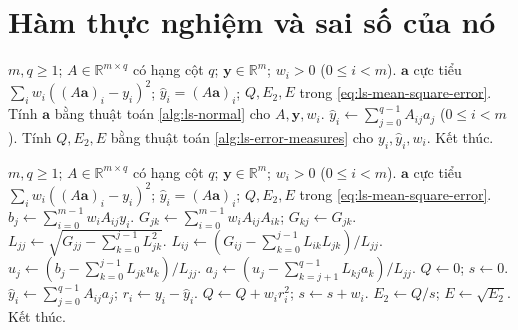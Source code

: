 \documentclass[12pt,a4paper,oneside]{book}
\numberwithin{algorithm}{chapter}
\theoremstyle{definition}
\newcommand{\R}{\mathbb{R}}
\begin{document}
\section{Hàm thực nghiệm và sai số của nó}
\begin{algorithm}[H]
\caption{Bình phương tối thiểu và sai số: sơ lược}
\label{alg:ls-fit-errors-short}
\begin{algorithmic}[1]
\Require $m,q\geq1$; $A\in\R^{m\times q}$ có hạng cột $q$; $\boldsymbol y\in\R^m$; $w_i>0$ ($0\leq i<m$).
\Ensure $\boldsymbol a$ cực tiểu $\sum_iw_i((A\boldsymbol a)_i-y_i)^2$; $\widehat y_i=(A\boldsymbol a)_i$; $Q,E_2,E$ trong \eqref{eq:ls-mean-square-error}.
\State Tính $\boldsymbol a$ bằng thuật toán \ref{alg:ls-normal} cho $A,\boldsymbol y,w_i$.
\State $\widehat y_i\gets\sum_{j=0}^{q-1}A_{ij}a_j$ ($0\leq i<m$).
\State Tính $Q,E_2,E$ bằng thuật toán \ref{alg:ls-error-measures} cho $y_i,\widehat y_i,w_i$.
\State Kết thúc.
\end{algorithmic}
\end{algorithm}
\begin{algorithm}[H]
\caption{Bình phương tối thiểu và sai số: chi tiết}
\label{alg:ls-fit-errors}
\begin{algorithmic}[1]
\Require $m,q\geq1$; $A\in\R^{m\times q}$ có hạng cột $q$; $\boldsymbol y\in\R^m$; $w_i>0$ ($0\leq i<m$).
\Ensure $\boldsymbol a$ cực tiểu $\sum_iw_i((A\boldsymbol a)_i-y_i)^2$; $\widehat y_i=(A\boldsymbol a)_i$; $Q,E_2,E$ trong \eqref{eq:ls-mean-square-error}.
 \State $b_j\gets\sum_{i=0}^{m-1}w_iA_{ij}y_i$.
  \State $G_{jk}\gets\sum_{i=0}^{m-1}w_iA_{ij}A_{ik}$; $G_{kj}\gets G_{jk}$.
 \EndFor
\EndFor
\Statex
{}
 \State $L_{jj}\gets\sqrt{G_{jj}-\sum_{k=0}^{j-1}L_{jk}^2}$.
  \State $L_{ij}\gets(G_{ij}-\sum_{k=0}^{j-1}L_{ik}L_{jk})/L_{jj}$.
 \EndFor
\EndFor
\Statex
{}
 \State $u_j\gets(b_j-\sum_{k=0}^{j-1}L_{jk}u_k)/L_{jj}$.
\EndFor
\Statex
{}
 \State $a_j\gets(u_j-\sum_{k=j+1}^{q-1}L_{kj}a_k)/L_{jj}$.
\EndFor
\Statex
\State $Q\gets0$; $s\gets0$.
 \State $\widehat y_i\gets\sum_{j=0}^{q-1}A_{ij}a_j$; $r_i\gets y_i-\widehat y_i$.
 \State $Q\gets Q+w_ir_i^2$; $s\gets s+w_i$.
\EndFor
\Statex
\State $E_2\gets Q/s$; $E\gets\sqrt{E_2}$.
\State Kết thúc.
\end{algorithmic}
\end{algorithm}

\end{document}
